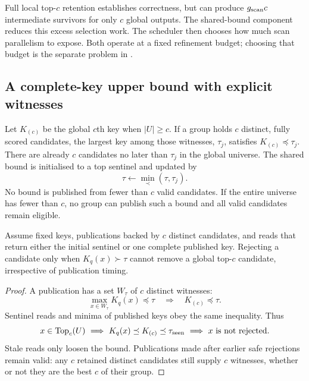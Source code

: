 Full local top-$c$ retention establishes correctness, but can produce
$g_{\mathrm{scan}} c$ intermediate survivors for only $c$ global outputs. The shared-bound
component reduces this excess selection work. The scheduler
then chooses how much scan parallelism to expose. Both operate at a fixed
refinement budget; choosing that budget is the separate problem in
.

\subsection{A complete-key upper bound with explicit witnesses}

Let $K_{(c)}$ be the global $c$th key when $|U|\geq c$. If a group holds
$c$ distinct, fully scored candidates, the largest key among those
witnesses, $\tau_j$, satisfies $K_{(c)}\preceq\tau_j$. There are already
$c$ candidates no later than $\tau_j$ in the global universe. The shared
bound is initialised to a top sentinel and updated by
\begin{equation}
 \tau\leftarrow\min_{\prec}(\tau,\tau_j).
 \label{eq:5-shared-update}
\end{equation}
No bound is published from fewer than $c$ valid candidates. If the entire
universe has fewer than $c$, no group can publish such a bound and all
valid candidates remain eligible.

\begin{resultblock}
\begin{proposition}
\label{prop:5-shared-bound}
Assume fixed keys, publications backed by $c$ distinct candidates, and
reads that return either the initial sentinel or one complete published
key. Rejecting a candidate only when $K_q(x)\succ\tau$ cannot remove a
global top-$c$ candidate, irrespective of publication timing.
\end{proposition}
\begin{proof}
A publication has a set $W_\tau$ of $c$ distinct witnesses:
\[
 \max_{x\in W_\tau}K_q(x)\preceq\tau
 \quad\Longrightarrow\quad K_{(c)}\preceq\tau.
\]
Sentinel reads and minima of published keys obey the same inequality. Thus
\[
 x\in\operatorname{Top}_c(U)
 \ \Longrightarrow\ K_q(x)\preceq K_{(c)}\preceq\tau_{\rm seen}
 \ \Longrightarrow\ x\text{ is not rejected}.
\]
Stale reads only loosen the bound. Publications
made after earlier safe rejections remain valid: any $c$ retained
distinct candidates still supply $c$ witnesses, whether or not they are
the best $c$ of their group.
\end{proof}
\end{resultblock}

